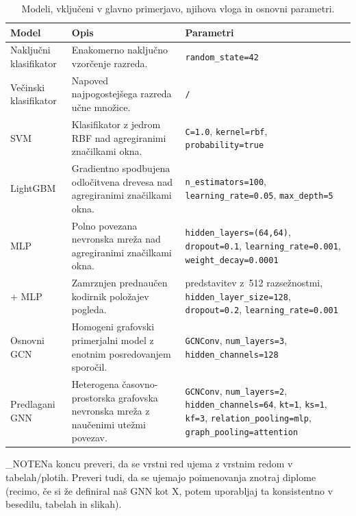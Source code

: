 \begin{table}[t]
    \centering
    \caption{Modeli, vključeni v glavno primerjavo, njihova vloga in osnovni parametri.}
    \label{tab:primerjani-modeli}
    \small
    \begin{tabularx}{\textwidth}{@{}>{\raggedright\arraybackslash}p{} >{\raggedright\arraybackslash}X >{\raggedright\arraybackslash}p{}@{}}
        \toprule
        Model & Opis & Parametri \\
        \midrule
        Naključni klasifikator & Enakomerno naključno vzorčenje razreda. & \texttt{random\_state=42} \\
        \addlinespace
        Večinski klasifikator & Napoved najpogostejšega razreda učne množice. & \texttt{/} \\
        \addlinespace
        SVM & Klasifikator z jedrom RBF nad agregiranimi značilkami okna. & \texttt{C=1.0}, \texttt{kernel=rbf}, \texttt{probability=true} \\
        \addlinespace
        LightGBM & Gradientno spodbujena odločitvena drevesa nad agregiranimi značilkami okna. & \texttt{n\_estimators=100}, \texttt{learning\_rate=0.05}, \texttt{max\_depth=5} \\
        \addlinespace
        MLP & Polno povezana nevronska mreža nad agregiranimi značilkami okna. & \texttt{hidden\_layers=(64,64)}, \texttt{dropout=0.1}, \texttt{learning\_rate=0.001}, \texttt{weight\_decay=0.0001} \\
        \addlinespace
        \GazeMAE{} + MLP & Zamrznjen prednaučen kodirnik položajev pogleda. & predstavitev z~512 razsežnostmi, \texttt{hidden\_layer\_size=128}, \texttt{dropout=0.2}, \texttt{learning\_rate=0.001} \\
        \addlinespace
        Osnovni GCN & Homogeni grafovski primerjalni model z enotnim posredovanjem sporočil. & \texttt{GCNConv}, \texttt{num\_layers=3}, \texttt{hidden\_channels=128} \\
        \addlinespace
        Predlagani GNN & Heterogena časovno-prostorska grafovska nevronska mreža z naučenimi utežmi povezav. & \texttt{GCNConv}, \texttt{num\_layers=2}, \texttt{hidden\_channels=64}, \texttt{kt=1}, \texttt{ks=1}, \texttt{kf=3}, \texttt{relation\_pooling=mlp}, \texttt{graph\_pooling=attention} \\
        \bottomrule
    \end{tabularx}
\end{table}
\END_NOTE{Na koncu preveri, da se vrstni red ujema z vrstnim redom v tabelah/plotih. Preveri tudi, da se ujemajo poimenovanja znotraj diplome (recimo, če si že definiral naš GNN kot X, potem uporabljaj ta konsistentno v besedilu, tabelah in slikah).}


